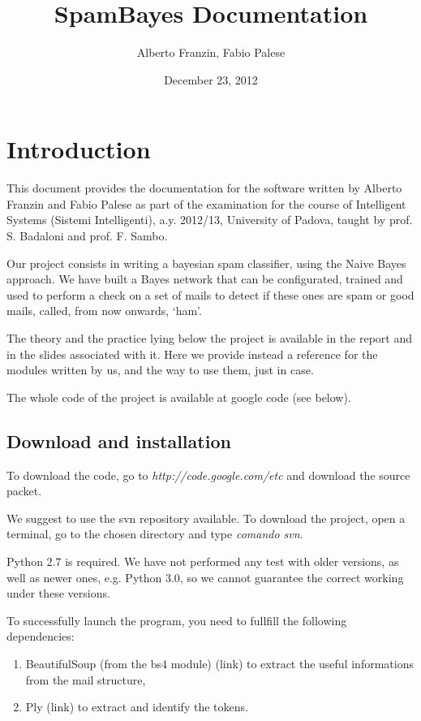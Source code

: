 \documentclass[letterpaper,10pt,english]{sphinxmanual}
\title{SpamBayes Documentation}
\date{December 23, 2012}
\author{Alberto Franzin, Fabio Palese}
\begin{document}
\maketitle
\tableofcontents
{}\label{index::doc}



\chapter{Introduction}
\label{index:introduction}\label{index:spambayes-s-documentation}
This document provides the documentation for the software written by Alberto Franzin and Fabio Palese as part of the examination for the course of Intelligent Systems (Sistemi Intelligenti), a.y. 2012/13, University of Padova, taught by prof. S. Badaloni and prof. F. Sambo.

Our project consists in writing a bayesian spam classifier, using the Naive Bayes approach. We have built a Bayes network that can be configurated, trained and used to perform a check on a set of mails to detect if these ones are spam or good mails, called, from now onwards, `ham'.

The theory and the practice lying below the project is available in the report and in the slides associated with it. Here we provide instead a reference for the modules written by us, and the way to use them, just in case.

The whole code of the project is available at google code (see below).


\section{Download and installation}
\label{index:download-and-installation}
To download the code, go to \emph{http://code.google.com/etc} and download the source packet.

We suggest to use the svn repository available. To download the project, open a terminal, go to the chosen directory and type
\emph{comando svn}.

Python 2.7 is required. We have not performed any test with older versions, as well as newer ones, e.g. Python 3.0, so we cannot guarantee the correct working under these versions.

To successfully launch the program, you need to fullfill the following dependencies:
\begin{enumerate}
\item {} 
BeautifulSoup (from the bs4 module) (link) to extract the useful informations from the mail structure,

\item {} 
Ply (link) to extract and identify the tokens.

\end{enumerate}
\end{document}

